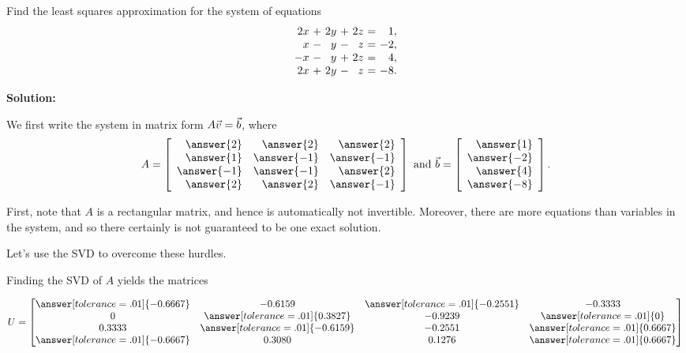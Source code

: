 \documentclass{ximera}
\begin{document}
\begin{example}\label{ex:least-squares-approximation}

  Find the least squares approximation for the system of equations
  \begin{equation*}
    \begin{array}{r@{~}c@{~}r@{~}c@{~}r@{~}c@{~}r}
      2x &+& 2y &+& 2z &=&  1, \\
      x  &-&  y &-&  z &=& -2, \\
      -x &-&  y &+& 2z &=&  4, \\
      2x &+& 2y &-&  z &=& -8. \\
    \end{array}
  \end{equation*}

  \textbf{Solution:}

  We first write the system in matrix form $A\vec{v}=\vec{b}$, where
  \begin{equation*}
    A = \startmat{rrr}
      \answer{2} & \answer{2} & \answer{2} \\
      \answer{1} & \answer{-1} & \answer{-1} \\
      \answer{-1} & \answer{-1} & \answer{2} \\
      \answer{2} & \answer{2} & \answer{-1} \\
    \stopmat
    \quad\mbox{and}\quad
    \vect{b} = \startmat{r} 
      \answer{1} \\ 
      \answer{-2} \\ 
      \answer{4} \\ 
      \answer{-8} 
    \stopmat.
\end{equation*}


First, note that $A$ is a rectangular matrix, and hence is automatically not invertible. Moreover, there are more equations than variables in the system, and so there certainly is not guaranteed to be one exact solution.

Let's use the SVD to overcome these hurdles. 

Finding the SVD of $A$ yields the matrices

\[
U =
\begin{bmatrix}
\answer[tolerance=.01]{-0.6667} & -0.6159 & \answer[tolerance=.01]{-0.2551} & -0.3333 \\
0 & \answer[tolerance=.01]{0.3827} & -0.9239 & \answer[tolerance=.01]{0} \\
0.3333 & \answer[tolerance=.01]{-0.6159} & -0.2551 & \answer[tolerance=.01]{0.6667} \\
\answer[tolerance=.01]{-0.6667} & 0.3080 & 0.1276 & \answer[tolerance=.01]{0.6667}
\end{bmatrix}
\]


\end{example}
\end{document}
